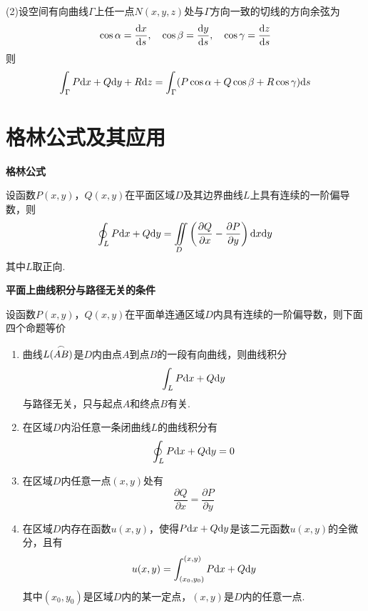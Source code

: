 (2)设空间有向曲线$\Gamma$上任一点$N(x,y,z)$处与$\Gamma$方向一致的切线的方向余弦为
\begin{equation*}
    \cos\alpha=\frac{\mathrm{d} x}{\mathrm{d} s},\quad \cos\beta=\frac{\mathrm{d} y}{\mathrm{d} s},\quad \cos\gamma=\frac{\mathrm{d} z}{\mathrm{d} s}
\end{equation*}
则
\begin{equation*}
    \int_{\Gamma}P\mathrm{d} x+Q\mathrm{d} y+R\mathrm{d} z=\int_{\Gamma}(P\cos\alpha+Q\cos\beta+R\cos\gamma)\mathrm{d} s
\end{equation*}

\section{格林公式及其应用}

\textbf{格林公式}

设函数$P(x,y)$，$Q(x,y)$在平面区域$D$及其边界曲线$L$上具有连续的一阶偏导数，则
\begin{equation*}
    \oint_{L}P\mathrm{d} x+Q\mathrm{d} y=\iint \limits_{D}\left(\frac{\partial Q}{\partial x}-\frac{\partial P}{\partial y}\right)\mathrm{d} x\mathrm{d} y
\end{equation*}
其中$L$取正向.

\textbf{平面上曲线积分与路径无关的条件}

设函数$P(x,y)$，$Q(x,y)$在平面单连通区域$D$内具有连续的一阶偏导数，则下面四个命题等价
\begin{enumerate}
    \item 曲线$L(\overset{\Large\frown}{AB})$是$D$内由点$A$到点$B$的一段有向曲线，则曲线积分
    \begin{equation*}
        \int_{L}P\mathrm{d} x+Q\mathrm{d} y
    \end{equation*}
    与路径无关，只与起点$A$和终点$B$有关.

    \item 在区域$D$内沿任意一条闭曲线$L$的曲线积分有
    \begin{equation*}
        \oint_{L}P\mathrm{d} x+Q\mathrm{d} y=0
    \end{equation*}

    \item 在区域$D$内任意一点$(x,y)$处有
    \begin{equation*}
        \dfrac{\partial Q}{\partial x}=\dfrac{\partial P}{\partial y}
    \end{equation*}

    \item 在区域$D$内存在函数$u(x,y)$，使得$P\mathrm{d} x+Q\mathrm{d} y$是该二元函数$u(x,y)$的全微分，且有
    \begin{equation*}
        u(x,y)=\int_{(x_0,y_0)}^{(x,y)}P\mathrm{d} x+Q\mathrm{d} y
    \end{equation*}
    其中$(x_0,y_0)$是区域$D$内的某一定点，$(x,y)$是$D$内的任意一点.
\end{enumerate}

